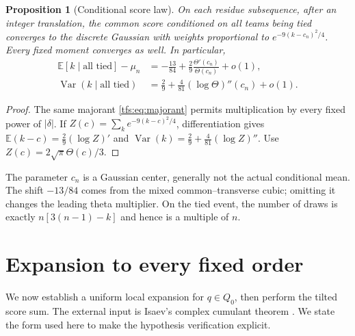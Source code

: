 \documentclass[11pt,a4paper]{article}
\numberwithin{equation}{section}
\newtheorem{proposition}[theorem]{Proposition}
\theoremstyle{remark}
\newcommand{\E}{\mathbb E}
\newcommand{\1}{\mathbf 1}
\newcommand{\Var}{\operatorname{Var}}
\begin{document}
\begin{proposition}[Conditional score law]\label{tfs:prop:conditional}
On each residue subsequence, after an integer translation, the common
score conditioned on all teams being tied converges to the discrete
Gaussian with weights proportional to $e^{-9(k-c_n)^2/4}$. Every fixed
moment converges as well. In particular,
\begin{align}\label{tfs:eq:condmean}
\E[k\mid\text{all tied}]-\mu_n
 &=-\frac{13}{84}+\frac29\frac{\Theta'(c_n)}{\Theta(c_n)}+o(1),\\
\Var(k\mid\text{all tied})
 &=\frac29+\frac4{81}(\log\Theta)''(c_n)+o(1).\label{tfs:eq:condvar}
\end{align}
\end{proposition}
\begin{proof}
The same majorant \eqref{tfs:eq:majorant} permits multiplication by every
fixed power of $|\delta|$. If $Z(c)=\sum_k e^{-9(k-c)^2/4}$, differentiation
gives $\E(k-c)=\tfrac29(\log Z)'$ and
$\Var(k)=\tfrac29+\tfrac4{81}(\log Z)''$. Use
$Z(c)=2\sqrt\pi\Theta(c)/3$.
\end{proof}
The parameter $c_n$ is a Gaussian center, generally not the actual
conditional mean. The shift $-13/84$ comes from the mixed common--transverse
cubic; omitting it changes the leading theta multiplier. On the tied event,
the number of draws is exactly $n[3(n-1)-k]$ and hence is a multiple of $n$.

\section{Expansion to every fixed order}\label{tfs:sec:allorders}
We now establish a uniform local expansion for $q\in Q_0$, then perform
the tilted score sum. The external input is Isaev's complex cumulant
theorem \cite[Theorem 1.2]{isaev}. We state the form used here to make the
hypothesis verification explicit.
\end{document}
